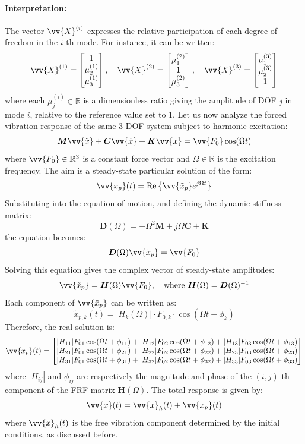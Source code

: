 \paragraph{Interpretation:}
The vector \( \vv{X}^{(i)} \) expresses the relative participation of each degree of freedom in the \( i \)-th mode. For instance, it can be written:
\[
\vv{X}^{(1)} =
\begin{bmatrix}
1 \\
\mu_2^{(1)} \\
\mu_3^{(1)}
\end{bmatrix}, \quad
\vv{X}^{(2)} =
\begin{bmatrix}
\mu_1^{(2)} \\
1 \\
\mu_3^{(2)}
\end{bmatrix}, \quad
\vv{X}^{(3)} =
\begin{bmatrix}
\mu_1^{(3)} \\
\mu_2^{(3)} \\
1
\end{bmatrix}
\]
where each \( \mu_j^{(i)} \in \mathbb{R} \) is a dimensionless ratio giving the amplitude of DOF \( j \) in mode \( i \), relative to the reference value set to 1. Let us now analyze the forced vibration response of the same 3-DOF system subject to harmonic excitation:
\[
\boldsymbol{M} \vv{\ddot{x}} + \boldsymbol{C} \vv{\dot{x}} + \boldsymbol{K} \vv{x} = \vv{F_0} \cos(\Omega t)
\]
where \( \vv{F_0} \in \mathbb{R}^3 \) is a constant force vector and \( \Omega \in \mathbb{R} \) is the excitation frequency. The aim is a steady-state particular solution of the form:
\[
\vv{x_p}(t) = \text{Re} \left\{ \vv{\tilde{x}_p} e^{j \Omega t} \right\}
\]
Substituting into the equation of motion, and defining the dynamic stiffness matrix:
\[
\boldsymbol{D}(\Omega) = -\Omega^2 \boldsymbol{M} + j \Omega \boldsymbol{C} + \boldsymbol{K}
\]
the equation becomes:
\[
\boldsymbol{D}(\Omega) \vv{\tilde{x}_p} = \vv{F_0}
\]
Solving this equation gives the complex vector of steady-state amplitudes:
\[
\vv{\tilde{x}_p} = \boldsymbol{H}(\Omega) \vv{F_0}, \quad \text{where } \boldsymbol{H}(\Omega) = \boldsymbol{D}(\Omega)^{-1}
\]
Each component of \( \vv{\tilde{x}_p} \) can be written as:
\[
\tilde{x}_{p,k}(t) = |H_k(\Omega)| \cdot F_{0,k} \cdot \cos(\Omega t + \phi_k)
\]
Therefore, the real solution is:
\[
\vv{x_p}(t) =
\begin{bmatrix}
|H_{11}| F_{01} \cos(\Omega t + \phi_{11}) + |H_{12}| F_{02} \cos(\Omega t + \phi_{12}) + |H_{13}| F_{03} \cos(\Omega t + \phi_{13}) \\
|H_{21}| F_{01} \cos(\Omega t + \phi_{21}) + |H_{22}| F_{02} \cos(\Omega t + \phi_{22}) + |H_{23}| F_{03} \cos(\Omega t + \phi_{23}) \\
|H_{31}| F_{01} \cos(\Omega t + \phi_{31}) + |H_{32}| F_{02} \cos(\Omega t + \phi_{32}) + |H_{33}| F_{03} \cos(\Omega t + \phi_{33})
\end{bmatrix}
\]
where \( |H_{ij}| \) and \( \phi_{ij} \) are respectively the magnitude and phase of the \( (i,j) \)-th component of the FRF matrix \( \boldsymbol{H}(\Omega) \). The total response is given by:
\[
\vv{x}(t) = \vv{x}_h(t) + \vv{x_p}(t)
\]
where \( \vv{x}_h(t) \) is the free vibration component determined by the initial conditions, as discussed before.

